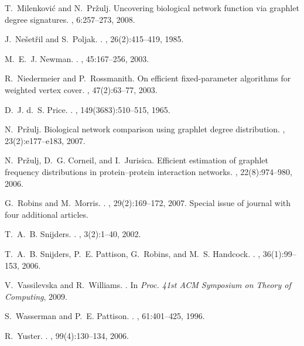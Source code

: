 \documentclass[11pt]{article}
\begin{document}
\begin{thebibliography}{10}
T.~Milenkovi{\'c} and N.~Pr\v{z}ulj.
\newblock Uncovering biological network function via graphlet degree
  signatures.
, 6:257--273, 2008.

J.~Ne{\v{s}}et{\v{r}}il and S.~Poljak.
.
,
  26(2):415{--}419, 1985.

M.~E.~J. Newman.
.
, 45:167{--}256, 2003.

R.~Niedermeier and P.~Rossmanith.
\newblock On efficient fixed-parameter algorithms for weighted vertex cover.
, 47(2):63--77, 2003.

D.~J. d.~S. Price.
.
, 149(3683):510{--}515, 1965.

N.~Pr\v{z}ulj.
\newblock Biological network comparison using graphlet degree distribution.
, 23(2):e177--e183, 2007.

N.~Pr\v{z}ulj, D.~G. Corneil, and I.~Jurisica.
\newblock Efficient estimation of graphlet frequency distributions in
  protein--protein interaction networks.
, 22(8):974--980, 2006.

G.~Robins and M.~Morris.
.
, 29(2):169{--}172, 2007.
\newblock Special issue of journal with four additional articles.

T.~A.~B. Snijders.
.
, 3(2):1{--}40, 2002.

T.~A.~B. Snijders, P.~E. Pattison, G.~Robins, and M.~S. Handcock.
.
, 36(1):99{--}153, 2006.

V.~Vassilevska and R.~Williams.
.
\newblock In {\em Proc. 41st ACM Symposium on Theory of Computing}, 2009.

S.~Wasserman and P.~E. Pattison.
.
, 61:401{--}425, 1996.

R.~Yuster.
.
, 99(4):130{--}134, 2006.

\end{thebibliography}
\end{document}
